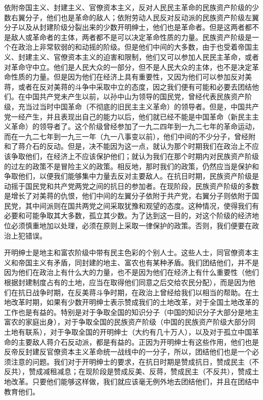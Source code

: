 \documentclass[UTF-8, a5paper, 12pt]{ctexart}
\begin{document}
依附帝国主义、封建主义、官僚资本主义，反对人民民主革命的民族资产阶级的少数右翼分子，他们也是革命的敌人；依附劳动人民反对反动派的民族资产阶级左翼分子以及从封建阶级分裂出来的少数开明绅士，他们也是革命者。但是这两者都不是敌人或革命者的主体，两者都不是可以决定革命性质的力量。民族资产阶级是一个在政治上非常软弱的和动摇的阶级。但是他们中间的大多数，由于也受着帝国主义、封建主义、官僚资本主义的迫害和限制，他们又可以参加人民民主革命，或者对革命守中立。他们是人民大众的一部分，但不是人民大众的主体，也不是决定革命性质的力量。但是因为他们在经济上具有重要性，又因为他们可以参加反对美蒋，或者在反对美蒋的斗争中采取中立的态度，因之我们便有可能和必要去团结他们。在中国共产党未产生以前，以孙中山为领导的国民党，曾经代表民族资产阶级，充当过当时中国革命（不彻底的旧民主主义革命）的领导者。但是，中国共产党一经产生，并且表现出自己的能力以后，他们就已经不能是中国革命（新民主主义革命）的领导者了。这个阶级曾经参加了一九二四年到一九二七年的革命运动，而在一九二七年到一九三一年（九一八事变以前），他们中间的不少分子，曾经附和了蒋介石的反动。但是，决不能因为这一点，就认为那个时期我们在政治上不应该争取他们，在经济上不应该保护他们；就认为我们在那个时期内对民族资产阶级的过左的政策不是冒险主义的政策。相反地，那时我们的政策，仍然应当是保护和争取他们，以便我们能够集中力量去反对主要敌人。在抗日时期，民族资产阶级是动摇于国民党和共产党两党之间的抗日的参加者。在现阶段，民族资产阶级的多数是增长了对美蒋的仇恨，他们中间的左翼分子依附于共产党，右翼分子则依附于国民党，其中间派则在国共两党之间采取犹豫和观望的态度。这种情况，使得我们有必要和可能争取其大多数，孤立其少数。为了达到这一目的，对这个阶级的经济地位必须慎重地加以处理，必须在原则上采取一律保护的政策。否则，我们便要在政治上犯错误。

开明绅士是地主和富农阶级中带有民主色彩的个别人士。这些人士，同官僚资本主义和帝国主义有矛盾，同封建的地主、富农也有某种矛盾。我们团结他们，并不是因为他们在政治上有什么大的力量，也不是因为他们在经济上有什么重要性（他们根据封建制度占有的土地，应当在取得他们同意之后交给农民分配），而是因为他们在抗日战争时期，在反美蒋斗争时期，在政治上曾经给我们以相当的帮助。在土地改革时期，如果有少数开明绅士表示赞成我们的土地改革，对于全国土地改革的工作也是有益的。特别是对于争取全国的知识分子（中国的知识分子大部分是地主富农的家庭出身），对于争取全国的民族资产阶级（中国的民族资产阶级大部分同土地有联系），对于争取全国的开明绅士（大约有几十万人），以及对于孤立中国革命的主要敌人蒋介石反动派，都是有益的。正因为开明绅士有这些作用，他们也是反帝反封建反官僚资本主义革命统一战线中的一分子，所以，团结他们也是一个必须注意的问题。我们对于开明绅士的要求，在抗日时期是赞成抗日，赞成民主（不反共），赞成减租减息；在现阶段是赞成反美、反蒋，赞成民主（不反共），赞成土地改革。只要他们能够这样做，我们就应该毫无例外地去团结他们，并且在团结中教育他们。
\end{document}
